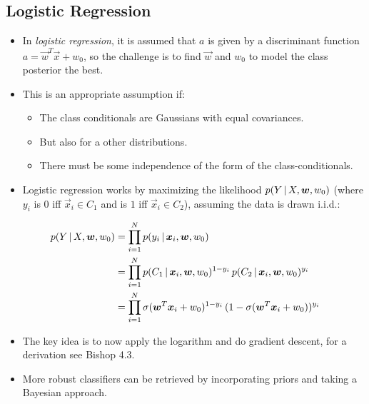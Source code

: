 		\subsection{Logistic Regression} %
			\begin{itemize}
				\item In \emph{logistic regression}, it is assumed that \( a \) is given by a discriminant function \( a = \vec{w}^T \vec{x} + w_0 \), so the challenge is to find \( \vec{w} \) and \( w_0 \) to model the class posterior the best.
				\item This is an appropriate assumption if:
					\begin{itemize}
						\item The class conditionals are Gaussians with equal covariances.
						\item But also for a other distributions.
						\item There must be some independence of the form of the class-conditionals.
					\end{itemize}
				\item Logistic regression works by maximizing the likelihood \( p(Y \,\vert\, X, \bm{w}, w_0) \) (where \( y_i \) is \(0\) iff \( \vec{x}_i \in C_1 \) and is \( 1 \) iff \( \vec{x}_i \in C_2 \)), assuming the data is drawn i.i.d.:
			\end{itemize}
			\begin{align} %
				p(Y \given X, \vec{w}, w_0) & = \prod_{i = 1}^{N} p(y_i \given \vec{x}_i, \vec{w}, w_0)                                                          \\
				                            & = \prod_{i = 1}^{N} p(C_1 \given \vec{x}_i, \vec{w}, w_0)^{1 - y_i} \, p(C_2 \given \vec{x}_i, \vec{w}, w_0)^{y_i} \\
				                            & = \prod_{i = 1}^{N} \sigma(\vec{w}^T \vec{x}_i + w_0)^{1 - y_i} \, (1 - \sigma(\vec{w}^T \vec{x}_i + w_0))^{y_i}
			\end{align}
			\begin{itemize}
				\item The key idea is to now apply the logarithm and do gradient descent, for a derivation see Bishop 4.3.
				\item More robust classifiers can be retrieved by incorporating priors and taking a Bayesian approach.
			\end{itemize}

